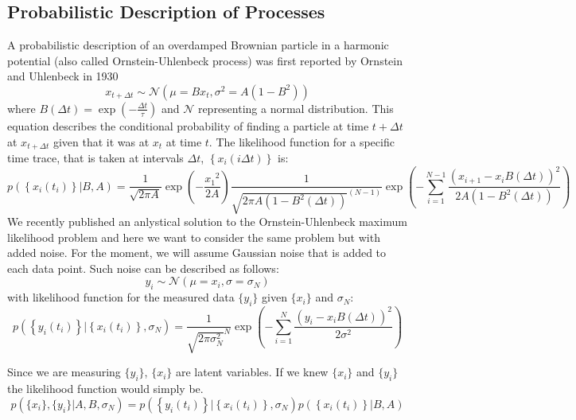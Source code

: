 \documentclass[%
 reprint,
 amsmath,amssymb,
 aps,
]{revtex4-1}
\begin{document}
\subsection{Probabilistic Description of Processes}
A probabilistic description of an overdamped Brownian particle in a harmonic potential (also called Ornstein-Uhlenbeck process) was first reported by Ornstein and Uhlenbeck in 1930 \cite{RN28}
\begin{equation}\label{OUp}
	x_{t+\Delta t} \sim \mathcal{N}(\mu=Bx_{t},\sigma^{2}=A(1-B^{2}))
\end{equation}
where $B(\Delta t) = \exp \left( { - \frac{\Delta t}{\tau}} \right)$ and $\mathcal{N}$ representing a normal distribution.
This equation describes the conditional probability of finding a particle at time $t+\Delta t$ at $x_{t+\Delta t}$ given that it was at $x_{t}$ at time $t$.  The likelihood function for a specific time trace, that is taken at intervals $\Delta t$, $\left\{x_i(i\Delta t)\right\}$ is:
\begin{equation}
	p\left( \left\{x_i(t_i)\right\} \left| B, A \right.\right) =
	\frac{1}{\sqrt {2 \pi A} }
	\exp \left( { - \frac{{x_1}^2}{2A}}\right)
	\frac{1}{{\sqrt {2\pi A(1-B^{2}(\Delta t))}^{(N-1)} }}
	\exp \left( { - \sum\limits_{i=1}^{N-1}\frac{{{{\left( {x_{i+1} - {x_i}B(\Delta t)} \right)}^2}}}{{2A(1-B^{2}(\Delta t))}}} \right)
\end{equation}
We recently published an anlystical solution to the Ornstein-Uhlenbeck maximum likelihood problem and here we want to consider the same problem but with added noise.  For the moment, we will assume Gaussian noise that is added to each data point.  Such noise can be described as follows:
\begin{equation}
	y_{i} \sim \mathcal{N}(\mu=x_{i},\sigma=\sigma_{N})
\end{equation}
with likelihood function for the measured data $\{y_{i}\}$ given $\{x_{i}\}$ and $\sigma_{N}$:
\begin{equation}
	p\left( \left\{y_i(t_i)\right\} \left| \left\{x_i(t_i)\right\},\sigma_{N} \right.\right) =
	\frac{1}{{\sqrt {2\pi \sigma_{N}^{2}}^{N} }}
	\exp \left( { - \sum\limits_{i=1}^{N}\frac{{{{\left( {y_{i} - x_{i}B(\Delta t)} \right)}^2}}}{{2\sigma^{2}}}} \right)
\end{equation}

Since we are measuring $\{y_{i}\}$, $\{x_{i}\}$ are latent variables.  If we knew $\{x_{i}\}$ and $\{y_{i}\}$ the likelihood function would simply be.
\begin{equation}
	p\left( \{x_{i}\},\{y_{i}\}|A,B,\sigma_{N}\right) = 
	p\left( \left\{y_i(t_i)\right\} \left| \left\{x_i(t_i)\right\},\sigma_{N} \right.\right)
	p\left( \left\{x_i(t_i)\right\} \left| B, A \right.\right)
\end{equation}
\end{document}

